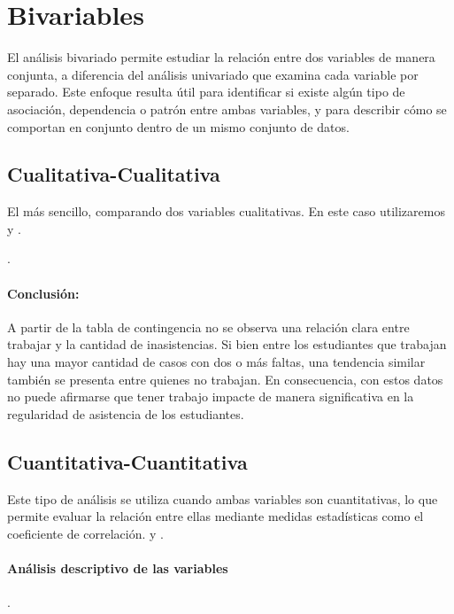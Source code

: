 \section{Bivariables}
El análisis bivariado permite estudiar la relación entre dos variables de manera conjunta, a
diferencia del análisis univariado que examina cada variable por separado. Este enfoque resulta
útil para identificar si existe algún tipo de asociación, dependencia o patrón entre ambas
variables, y para describir cómo se comportan en conjunto dentro de un mismo conjunto de datos.

\subsection{Cualitativa-Cualitativa}
El más sencillo, comparando dos variables cualitativas. En este caso utilizaremos
 y .


\TablaDeDatos
.



\paragraph{Conclusión:} A partir de la tabla de contingencia no se observa una relación clara entre trabajar y la cantidad de inasistencias. Si bien entre los estudiantes que trabajan hay una mayor cantidad de casos con dos o más faltas, una tendencia similar también se presenta entre quienes no trabajan. En consecuencia, con estos datos no puede afirmarse que tener trabajo impacte de manera significativa en la regularidad de asistencia de los estudiantes.


\subsection{Cuantitativa-Cuantitativa}
Este tipo de análisis se utiliza cuando ambas variables son cuantitativas, lo que permite evaluar la relación entre ellas mediante medidas estadísticas como el coeficiente de correlación.
 y .

\paragraph{Análisis descriptivo de las variables}.

